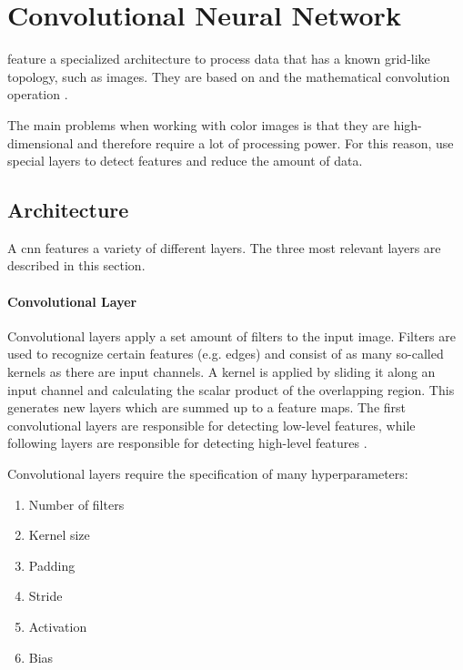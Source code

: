 \section{Convolutional Neural Network}
\label{sec:theoretical_background:cnn}

 feature a specialized architecture to process data that has a known grid-like topology, such as images.
They are based on  and the mathematical convolution operation \cite[p.~326--331]{deeplearningbook}.

The main problems when working with color images is that they are high-dimensional and therefore require a lot of processing power.
For this reason,  use special layers to detect features and reduce the amount of data.

\subsection{Architecture}
\label{subsec:theoretical_background:cnn:architecture}

A \acrlong{cnn} features a variety of different layers.
The three most relevant layers are described in this section.

\paragraph{Convolutional Layer}
Convolutional layers apply a set amount of filters to the input image.
Filters are used to recognize certain features (e.g. edges) and consist of as many so-called kernels as there are input channels.
A kernel is applied by sliding it along an input channel and calculating the scalar product of the overlapping region.
This generates new layers which are summed up to a feature maps. %
The first convolutional layers are responsible for detecting low-level features, while following layers are responsible for detecting high-level features \cite[p.~327--330]{deeplearningbook}.

Convolutional layers require the specification of many hyperparameters:
\begin{enumerate}
  \item Number of filters
  \item Kernel size
  \item Padding
  \item Stride
  \item Activation
  \item Bias
\end{enumerate}

